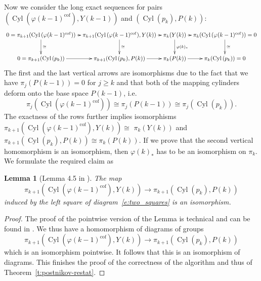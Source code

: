 \documentclass[12pt,a4wide]{article}
\theoremstyle{plain}
\newtheorem{lemma}[thm]{Lemma}
\theoremstyle{definition}
\newcommand{\cofr}{\mathrm{cof}}
\newcommand{\Pst}[1]{P(#1)}
\newcommand{\Yst}[1]{Y(#1)}
\newcommand{\towercompmap}[2]{#1(#2)}
\DeclareMathOperator\MCyltemp{{Cyl}}
\newcommand{\MCyl}[1]{\MCyltemp{({#1})}}
\newcommand{\varphist}[1]{\towercompmap{\varphi}{#1}}
\newcommand{\thedimm}{{k}}
\newcommand{\thedimmm}{{j}}
\renewcommand\:{\colon}
\newcommand{\dpi}{\pi}
\begin{document}
Now we consider the long exact sequences for pairs
$(\MCyl{\varphist{\thedimm-1}^\cofr},\Yst{\thedimm -1})$ and $(\MCyl{p_{\thedimm}},\Pst{\thedimm})$:
\[\xymatrix@C=6pt{
0=\dpi_{\thedimm+1}(\MCyl{\varphist{\thedimm-1}^\cofr})\ar[r]
\ar[d]^{\cong}
& \dpi_{\thedimm+1}(\MCyl{\varphist{\thedimm-1}^\cofr},\Yst{\thedimm}) \ar[d]^{\cong} \ar[r]
& \dpi_{\thedimm}(\Yst{\thedimm}) \ar[d]^{\varphist{\thedimm}_*} \ar[r]
& \dpi_{\thedimm}(\MCyl{\varphist{\thedimm-1}^\cofr})=0 \ar[d]^{\cong}\\
0=\dpi_{\thedimm+1}(\MCyl{p_{\thedimm}})
\ar[r] & \dpi_{\thedimm+1}(\MCyl{p_{\thedimm}},\Pst{\thedimm}) \ar[r]
& \dpi_{\thedimm}(\Pst{\thedimm}) \ar[r] & \pi_{\thedimm}(\MCyl{p_{\thedimm}})=0
 }\]
The first and the last vertical arrows are isomorphisms due to the fact that we have $\dpi_\thedimmm(\Pst{\thedimm-1})=0$ for $\thedimmm\ge \thedimm$ and that both of the mapping cylinders deform onto the base space $\Pst{\thedimm-1}$, i.e. 
\[
\dpi_{\thedimmm}(\MCyl{\varphist{\thedimm-1}^\cofr}) \cong \dpi_{\thedimmm}(\Pst{\thedimm-1}) \cong \dpi_{\thedimmm}(\MCyl{p_{\thedimm}}). 
\]
The exactness of the rows further implies isomorphisms
$\dpi_{\thedimm+1}(\MCyl{\varphist{\thedimm-1}^\cofr},\Yst{\thedimm}) 
\cong$ $\dpi_{\thedimm}(\Yst{\thedimm})$ and  $\dpi_{\thedimm+1}(\MCyl{p_{\thedimm}},\Pst{\thedimm}) \cong \dpi_{\thedimm}(\Pst{\thedimm})$. If we prove that the second vertical homomorphism is an isomorphism, then  $\varphist{\thedimm}_*$ has to be an isomorphism on $\dpi_{\thedimm}$. We formulate the required claim as
\begin{lemma}[Lemma 4.5 in \cite{polypost}]\label{l:cylindrak}
The map \[\dpi_{\thedimm+1}(\MCyl{\varphist{\thedimm -1}^\cofr} ,\Yst{\thedimm})\to\dpi_{\thedimm+1}
(\MCyl{p_{\thedimm}} ,\Pst{\thedimm})
\]
induced by the left square of diagram~\eqref{e:two_squares} is an isomorphism.
\end{lemma}
\begin{proof}
The proof of the pointwise version of the Lemma is technical and can be found in \cite{polypost}. We thus have a homomorphism of diagrams of groups 
\[\dpi_{\thedimm+1}(\MCyl{\varphist{\thedimm -1}^\cofr} ,\Yst{\thedimm})\to\dpi_{\thedimm+1}
(\MCyl{p_{\thedimm}} ,\Pst{\thedimm})\]
 which is an isomorphism pointwise. It follows that this is an isomorphism of diagrams. This finishes the proof of the correctness of the algorithm and thus of Theorem~\ref{t:postnikov-restat}.
\end{proof}
\end{document}

